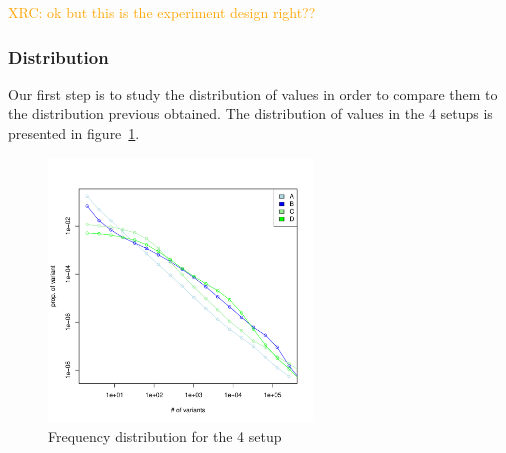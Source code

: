 \documentclass{wscpaperproc}
\newcommand{\memo}[2]{\textcolor{#1}{#2}}
\newcommand{\xrc}[1]{\memo{orange}{XRC: #1\\}}
\begin{document}
\xrc{ok but this is the experiment design right??}

\subsubsection{Distribution}


Our first step is to study the distribution of values in order to compare them to the distribution previous obtained. The distribution of values in the 4 setups is presented in figure~\ref{fig:4setDi}. 

\begin{figure}[H]
	\begin{center}
		\includegraphics[width=7cm]{img/frequenciesABCD.pdf}
	\end{center}
	\caption{Frequency distribution for the 4 setup}
	\label{fig:4setDi}
\end{figure}
\end{document}
